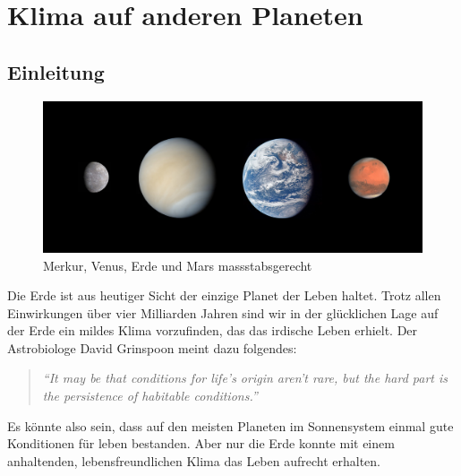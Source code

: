 %
%
%

\chapter{Klima auf anderen Planeten\label{chapter:thema}}
\begin{refsection}

\section{Einleitung}

\begin{figure}
	\centering
	\includegraphics[width=0.7\linewidth, trim={0 2cm 0 2cm},clip]{planeten/Pictures/planets2.jpg}
	\caption{Merkur, Venus, Erde und Mars massstabsgerecht}
\end{figure}

Die Erde ist aus heutiger Sicht der einzige Planet der Leben haltet. Trotz allen Einwirkungen über vier Milliarden Jahren sind wir in der glücklichen Lage auf der Erde ein mildes Klima vorzufinden, das das irdische Leben erhielt. 
Der Astrobiologe David Grinspoon meint dazu folgendes:
\begin{quote}
\textit{“It may be that conditions for life’s origin aren’t rare, but the hard part is the persistence of habitable conditions.”} \\
\end{quote}
Es könnte also sein, dass auf den meisten Planeten im Sonnensystem einmal gute Konditionen für leben bestanden. Aber nur die Erde konnte mit einem anhaltenden, lebensfreundlichen Klima das Leben aufrecht erhalten.


\end{refsection}
